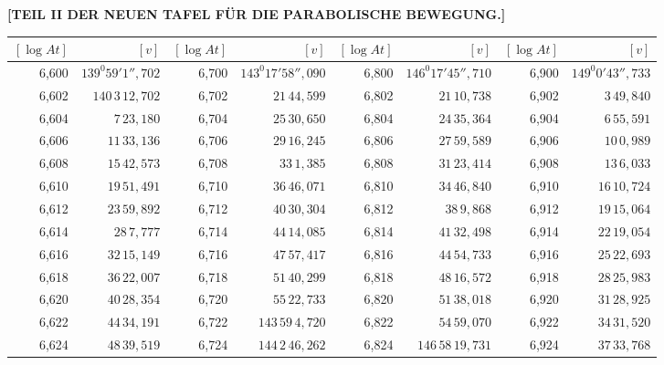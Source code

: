 \clearpage
{}
\begingroup
\centering
\fontsize{9}{9}\selectfont
\setlength{\tabcolsep}{.75pt}
\renewcommand{\arraystretch}{.9}
\setlength{\parskip}{0pt}
\textbf{[TEIL II DER NEUEN TAFEL FÜR DIE PARABOLISCHE BEWEGUNG.]}
\par\vspace{7pt}
\begin{tabular}{|r|r||r|r||r|r||r|r|}
\hline
\([\log At]\) & \([v]\) & \([\log At]\) & \([v]\) & \([\log At]\) & \([v]\) & \([\log At]\) & \([v]\) \\
\hline
6,600 & \(139^{0}59'1'',\!702\) & 6,700 & \(143^{0}17'58'',\!090\) & 6,800 & \(146^{0}17'45'',\!710\) & 6,900 & \(149^{0}0'43'',\!733\) \\[1pt]
6,602 & \(140\,3\,12,\!702\) & 6,702 & \(21\,44,\!599\) & 6,802 & \(21\,10,\!738\) & 6,902 & \(3\,49,\!840\) \\
6,604 & \(7\,23,\!180\) & 6,704 & \(25\,30,\!650\) & 6,804 & \(24\,35,\!364\) & 6,904 & \(6\,55,\!591\) \\
6,606 & \(11\,33,\!136\) & 6,706 & \(29\,16,\!245\) & 6,806 & \(27\,59,\!589\) & 6,906 & \(10\,0,\!989\) \\
6,608 & \(15\,42,\!573\) & 6,708 & \(33\,1,\!385\) & 6,808 & \(31\,23,\!414\) & 6,908 & \(13\,6,\!033\) \\
6,610 & \(19\,51,\!491\) & 6,710 & \(36\,46,\!071\) & 6,810 & \(34\,46,\!840\) & 6,910 & \(16\,10,\!724\) \\[1pt]
6,612 & \(23\,59,\!892\) & 6,712 & \(40\,30,\!304\) & 6,812 & \(38\,9,\!868\) & 6,912 & \(19\,15,\!064\) \\
6,614 & \(28\,7,\!777\) & 6,714 & \(44\,14,\!085\) & 6,814 & \(41\,32,\!498\) & 6,914 & \(22\,19,\!054\) \\
6,616 & \(32\,15,\!149\) & 6,716 & \(47\,57,\!417\) & 6,816 & \(44\,54,\!733\) & 6,916 & \(25\,22,\!693\) \\
6,618 & \(36\,22,\!007\) & 6,718 & \(51\,40,\!299\) & 6,818 & \(48\,16,\!572\) & 6,918 & \(28\,25,\!983\) \\
6,620 & \(40\,28,\!354\) & 6,720 & \(55\,22,\!733\) & 6,820 & \(51\,38,\!018\) & 6,920 & \(31\,28,\!925\) \\[1pt]
6,622 & \(44\,34,\!191\) & 6,722 & \(143\,59\,4,\!720\) & 6,822 & \(54\,59,\!070\) & 6,922 & \(34\,31,\!520\) \\
6,624 & \(48\,39,\!519\) & 6,724 & \(144\,2\,46,\!262\) & 6,824 & \(146\,58\,19,\!731\) & 6,924 & \(37\,33,\!768\) \\

\end{tabular}
